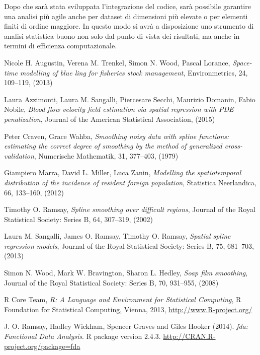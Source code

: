 \documentclass[a4paper,11pt,twoside,openright]{book}							%
\begin{document}
Dopo che sarà stata sviluppata l'integrazione del codice, sarà possibile garantire una analisi più agile anche per dataset di dimensioni più elevate o per elementi finiti di ordine maggiore. In questo modo si avrà a disposizione uno strumento di analisi statistica buono non solo dal punto di vista dei risultati, ma anche in termini di efficienza computazionale.


\begin{thebibliography}{99}

Nicole H. Augustin, Verena M. Trenkel, Simon N. Wood, Pascal Lorance, \emph{Space-time modelling of blue ling for fisheries stock management}, Environmetrics, 24, 109–119, (2013)

Laura Azzimonti, Laura M. Sangalli, Piercesare Secchi, Maurizio Domanin, Fabio Nobile, \emph{Blood flow velocity field estimation via spatial regression with PDE penalization}, Journal of the American Statistical Association, (2015)

Peter Craven, Grace Wahba, \emph{Smoothing noisy data with spline functions: estimating the correct degree of smoothing by the method of generalized cross-validation}, Numerische Mathematik, 31, 377–403, (1979)

Giampiero Marra, David L. Miller, Luca Zanin, \emph{Modelling the spatiotemporal distribution of the incidence of resident foreign population}, Statistica Neerlandica, 66, 133–160, (2012)

Timothy O. Ramsay, \emph{Spline smoothing over difficult regions}, Journal of the Royal Statistical Society: Series B, 64, 307–319, (2002)

Laura M. Sangalli, James O. Ramsay, Timothy O. Ramsay, \emph{Spatial spline regression models}, Journal of the Royal Statistical Society: Series B, 75, 681–703, (2013)

Simon N. Wood, Mark W. Bravington, Sharon L. Hedley, \emph{Soap film smoothing}, Journal of the Royal Statistical Society: Series B, 70, 931–955, (2008)

R Core Team, \emph{R: A Language and Environment for Statistical Computing}, R Foundation for Statistical Computing, Vienna, 2013, \href{http://www.R-project.org/}{http://www.R-project.org/}


J. O. Ramsay, Hadley Wickham, Spencer Graves and Giles Hooker (2014). \emph{fda: Functional Data Analysis}. R package version 2.4.3. \href{http://CRAN.R-project.org/package=fda}{http://CRAN.R-project.org/package=fda}


\end{thebibliography}
\end{document}
